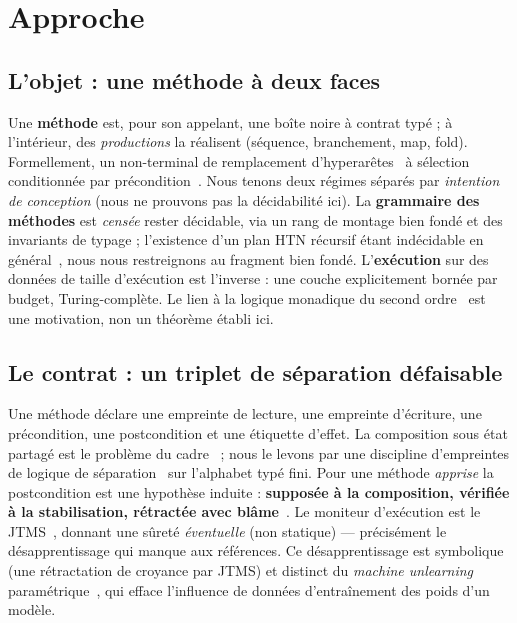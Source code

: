 \documentclass[11pt]{article}
\begin{document}
\section{Approche}
\subsection{L'objet : une méthode à deux faces}
Une \textbf{méthode} est, pour son appelant, une boîte noire à contrat typé ; à l'intérieur, des
\emph{productions} la réalisent (séquence, branchement, map, fold). Formellement, un non-terminal de remplacement
d'hyperarêtes~\cite{habel1992,drewes1997} à sélection conditionnée par précondition~\cite{erol1994}. Nous tenons
deux régimes séparés par \emph{intention de conception} (nous ne prouvons pas la décidabilité ici). La
\textbf{grammaire des méthodes} est \emph{censée} rester décidable, via un rang de montage bien fondé et des
invariants de typage ; l'existence d'un plan HTN récursif étant indécidable en général~\cite{erol1996}, nous nous
restreignons au fragment bien fondé. L'\textbf{exécution} sur des données de taille d'exécution est l'inverse : une
couche explicitement bornée par budget, Turing-complète. Le lien à la logique monadique du second ordre~\cite{courcelle1990} est une motivation, non un
théorème établi ici.

\subsection{Le contrat : un triplet de séparation défaisable}
Une méthode déclare une empreinte de lecture, une empreinte d'écriture, une précondition, une postcondition et une
étiquette d'effet. La composition sous état partagé est le problème du cadre~\cite{mccarthy1969} ; nous le levons
par une discipline d'empreintes de logique de séparation~\cite{ohearn2001,reynolds2002} sur l'alphabet typé fini.
Pour une méthode \emph{apprise} la postcondition est une hypothèse induite : \textbf{supposée à la composition,
vérifiée à la stabilisation, rétractée avec blâme}~\cite{findler2002,bader2018}. Le moniteur d'exécution est le
JTMS~\cite{doyle1979}, donnant une sûreté \emph{éventuelle} (non statique) --- précisément le désapprentissage qui
manque aux références. Ce désapprentissage est symbolique (une rétractation de croyance par JTMS) et distinct du
\emph{machine unlearning} paramétrique~\cite{bourtoule2021}, qui efface l'influence de données d'entraînement des
poids d'un modèle.
\end{document}
